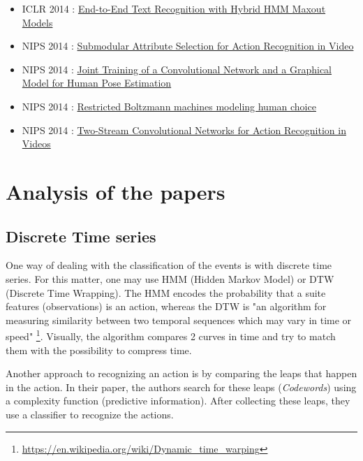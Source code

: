 \documentclass[a4paper]{article}
\begin{document}
\begin{itemize}
			\item ICLR 2014 : \href{http://arxiv.org/pdf/1310.1811v1.pdf}{End-to-End Text Recognition with Hybrid HMM Maxout Models}
			\item NIPS 2014 : \href{http://papers.nips.cc/paper/5565-submodular-attribute-selection-for-action-recognition-in-video.pdf}{Submodular Attribute Selection for Action Recognition in Video}
			\item NIPS 2014 : \href{http://papers.nips.cc/paper/5573-joint-training-of-a-convolutional-network-and-a-graphical-model-for-human-pose-estimation.pdf}{Joint Training of a Convolutional Network and a Graphical Model for Human Pose Estimation}
			\item NIPS 2014 : \href{http://papers.nips.cc/paper/5280-restricted-boltzmann-machines-modeling-human-choice.pdf}{Restricted Boltzmann machines modeling human choice}
			\item NIPS 2014 : \href{http://papers.nips.cc/paper/5353-two-stream-convolutional-networks-for-action-recognition-in-videos.pdf}{Two-Stream Convolutional Networks for Action Recognition in Videos}
		\end{itemize}

	\section{Analysis of the papers}
		\subsection{Discrete Time series}
			One way of dealing with the classification of the events is with discrete time series. For this matter, one may use HMM (Hidden Markov Model) or DTW (Discrete Time Wrapping). The HMM encodes the probability that a suite features (observations) is an action, whereas the DTW is "an algorithm for measuring similarity between two temporal sequences which may vary in time or speed" \footnote{\url{https://en.wikipedia.org/wiki/Dynamic_time_warping}}. Visually, the algorithm compares 2 curves in time and try to match them with the possibility to compress time.
			
			Another approach to recognizing an action is by comparing the leaps that happen in the action. In their paper\cite{kwon2014complexity}, the authors search for these leaps (\textit{Codewords}) using a complexity function (predictive information\cite{bialek2001predictability}). After collecting these leaps, they use a classifier to recognize the actions.
\end{document}
